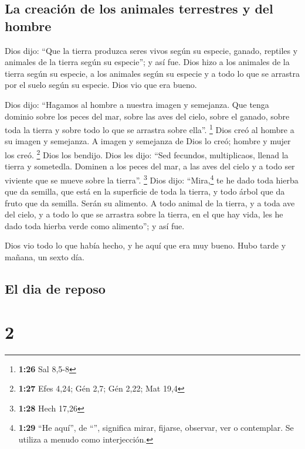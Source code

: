 \hypertarget{la-creaciuxf3n-de-los-animales-terrestres-y-del-hombre}{%
\subsection{La creación de los animales terrestres y del
hombre}\label{la-creaciuxf3n-de-los-animales-terrestres-y-del-hombre}}

 Dios dijo: ``Que la tierra produzca seres vivos según su
especie, ganado, reptiles y animales de la tierra según su especie''; y
así fue.  Dios hizo a los animales de la tierra según su
especie, a los animales según su especie y a todo lo que se arrastra por
el suelo según su especie. Dios vio que era bueno.

 Dios dijo: ``Hagamos al hombre a nuestra imagen y
semejanza. Que tenga dominio sobre los peces del mar, sobre las aves del
cielo, sobre el ganado, sobre toda la tierra y sobre todo lo que se
arrastra sobre ella''. \footnote{\textbf{1:26} Sal 8,5-8}
 Dios creó al hombre a su imagen y semejanza. A imagen y
semejanza de Dios lo creó; hombre y mujer los creó. \footnote{\textbf{1:27}
  Efes 4,24; Gén 2,7; Gén 2,22; Mat 19,4}  Dios los
bendijo. Dios les dijo: ``Sed fecundos, multiplicaos, llenad la tierra y
sometedla. Dominen a los peces del mar, a las aves del cielo y a todo
ser viviente que se mueve sobre la tierra''. \footnote{\textbf{1:28}
  Hech 17,26}  Dios dijo: ``Mira,\footnote{\textbf{1:29}
  ``He aquí'', de ``'', significa mirar, fijarse, observar,
  ver o contemplar. Se utiliza a menudo como interjección.} te he dado
toda hierba que da semilla, que está en la superficie de toda la tierra,
y todo árbol que da fruto que da semilla. Serán su alimento.
 A todo animal de la tierra, y a toda ave del cielo, y a
todo lo que se arrastra sobre la tierra, en el que hay vida, les he dado
toda hierba verde como alimento''; y así fue.

 Dios vio todo lo que había hecho, y he aquí que era muy
bueno. Hubo tarde y mañana, un sexto día.

\hypertarget{el-dia-de-reposo}{%
\subsection{El dia de reposo}\label{el-dia-de-reposo}}

\hypertarget{section-1}{%
\section{2}\label{section-1}}

